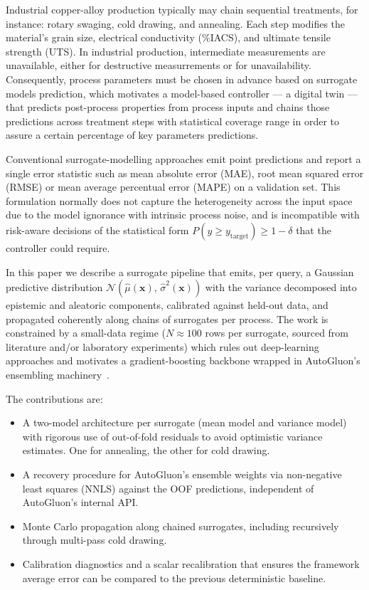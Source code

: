 \documentclass[conference]{IEEEtran}
\begin{document}
Industrial copper-alloy production typically may chain sequential treatments, for instance: rotary swaging, cold drawing, and annealing. Each step modifies the material's grain size, electrical conductivity (\%IACS), and ultimate tensile strength (UTS). In industrial production, intermediate measurements are unavailable, either for destructive measurrements or for unavailability. Consequently, process parameters must be chosen in advance based on surrogate models prediction, which motivates a model-based controller --- a digital twin --- that predicts post-process properties from process inputs and chains those predictions across treatment steps with statistical coverage range in order to assure a certain percentage of key parameters predictions.

Conventional surrogate-modelling approaches emit point predictions and report a single error statistic such as mean absolute error (MAE), root mean squared error (RMSE) or mean average percentual error (MAPE) on a validation set. This formulation normally does not capture the heterogeneity across the input space due to the model ignorance with intrinsic process noise, and is incompatible with risk-aware decisions of the statistical form $P(y \geq y_{\text{target}}) \geq 1 - \delta$ that the controller could require.

In this paper we describe a surrogate pipeline that emits, per query, a Gaussian predictive distribution $\mathcal{N}(\hat\mu(\bm x),\, \hat\sigma^2(\bm x))$ with the variance decomposed into epistemic and aleatoric components, calibrated against held-out data, and propagated coherently along chains of surrogates per process. The work is constrained by a small-data regime ($N \approx 100$ rows per surrogate, sourced from literature and/or laboratory experiments) which rules out deep-learning approaches and motivates a gradient-boosting backbone wrapped in AutoGluon's ensembling machinery~\cite{autogluon}.

The contributions are:
\begin{itemize}
    \item A two-model architecture per surrogate (mean model and variance model) with rigorous use of out-of-fold residuals to avoid optimistic variance estimates. One for annealing, the other for cold drawing.
    \item A recovery procedure for AutoGluon's ensemble weights via non-negative least squares (NNLS) against the OOF predictions, independent of AutoGluon's internal API.
    \item Monte Carlo propagation along chained surrogates, including recursively through multi-pass cold drawing.
    \item Calibration diagnostics and a scalar recalibration that ensures the framework average error can be compared to the previous deterministic baseline.
\end{itemize}
\end{document}
